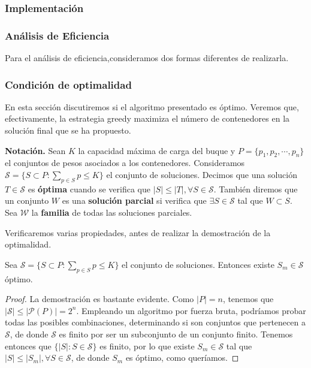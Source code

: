 \subsubsection{Implementación}



\subsubsection{Análisis de Eficiencia}

Para el análisis de eficiencia,consideramos dos formas diferentes de realizarla. 

\subsubsection{Condición de optimalidad}
En esta sección discutiremos si el algoritmo presentado es óptimo. Veremos que,
efectivamente, la estrategia greedy maximiza el número de contenedores 
en la solución final que se ha propuesto. 

\textbf{Notación.} Sean $K$ la capacidad máxima de carga del buque y
$P = \{p_1,p_2,\cdots,p_n\}$ el conjuntos de pesos asociados
a los contenedores. Consideramos $\mathcal{S} = \{S \subset P : 
\sum_{p \in S} p \leq K\}$ el conjunto de soluciones. Decimos que una solución
$T \in \mathcal{S}$ es \textbf{óptima} cuando se verifica que $|S| \leq |T|,
\forall S \in \mathcal{S}$. 
También diremos que un conjunto $W$ es una \textbf{solución parcial}
si verifica que $\exists S \in \mathcal S$ tal que $W \subset S$. Sea $\mathcal{W}$ 
la \textbf{familia} de todas las soluciones parciales.

Verificaremos varias propiedades, antes de realizar la demostración de la optimalidad.

\begin{lemma}
    Sea $\mathcal{S} = \{S \subset P : \sum_{p \in S} p \leq K\}$ el conjunto de soluciones. Entonces
    existe $S_m \in \mathcal S$ óptimo. 
\end{lemma}

\begin{proof}
    La demostración es bastante evidente. Como $|P| = n$, tenemos que $|\mathcal S| \leq |\mathcal P (P)| = 2^n$. 
    Empleando un algoritmo por fuerza bruta, podríamos probar todas las posibles combinaciones, determinando si
    son conjuntos que pertenecen a $\mathcal S$, de donde $\mathcal S$ es finito por ser un subconjunto de un conjunto finito. 
    Tenemos entonces que $\{|S| : S \in \mathcal S\}$ es finito, por lo que existe $S_m \in \mathcal S$ tal que
    $|S| \leq |S_m|, \forall S \in \mathcal S$, de donde $S_m$ es óptimo, como queríamos. 
\end{proof}

